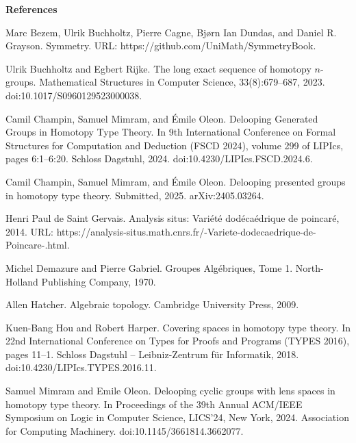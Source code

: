 
 
\par\medskip\noindent\textbf{References}\par
  
\par\noindent  [1]  Marc Bezem, Ulrik Buchholtz, Pierre Cagne, Bjørn Ian Dundas, and Daniel R. Grayson.  Symmetry.  URL: https://github.com/UniMath/SymmetryBook.  
 
\par\noindent  [2]  Ulrik Buchholtz and Egbert Rijke.  The long exact sequence of homotopy $n$-groups.  Mathematical Structures in Computer Science, 33(8):679–687, 2023.  doi:10.1017/S0960129523000038.  
 
\par\noindent  [3]  Camil Champin, Samuel Mimram, and Émile Oleon.  Delooping Generated Groups in Homotopy Type Theory.  In 9th International Conference on Formal Structures for Computation and Deduction (FSCD 2024), volume 299 of LIPIcs, pages 6:1–6:20. Schloss Dagstuhl, 2024.  doi:10.4230/LIPIcs.FSCD.2024.6.  
 
\par\noindent  [4]  Camil Champin, Samuel Mimram, and Émile Oleon.  Delooping presented groups in homotopy type theory.  Submitted, 2025.  arXiv:2405.03264.  
 
\par\noindent  [5]  Henri Paul de Saint Gervais.  Analysis situs: Variété dodécaédrique de poincaré, 2014.  URL: https://analysis-situs.math.cnrs.fr/-Variete-dodecaedrique-de-Poincare-.html.  
 
\par\noindent  [6]  Michel Demazure and Pierre Gabriel.  Groupes Algébriques, Tome 1.  North-Holland Publishing Company, 1970.  
 
\par\noindent  [7]  Allen Hatcher.  Algebraic topology.  Cambridge University Press, 2009.  
 
\par\noindent  [8]  Kuen-Bang Hou and Robert Harper.  Covering spaces in homotopy type theory.  In 22nd International Conference on Types for Proofs and Programs (TYPES 2016), pages 11–1. Schloss Dagstuhl – Leibniz-Zentrum für Informatik, 2018.  doi:10.4230/LIPIcs.TYPES.2016.11.  
 
\par\noindent  [9]  Samuel Mimram and Emile Oleon.  Delooping cyclic groups with lens spaces in homotopy type theory.  In Proceedings of the 39th Annual ACM/IEEE Symposium on Logic in Computer Science, LICS’24, New York, 2024. Association for Computing Machinery.  doi:10.1145/3661814.3662077.  
 
